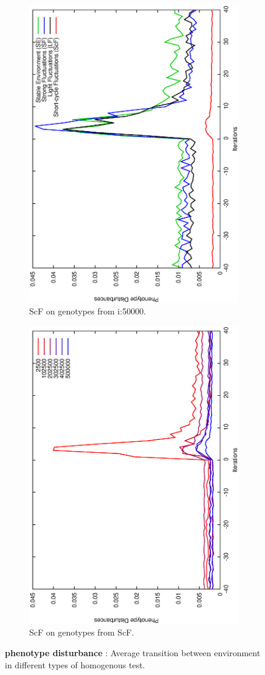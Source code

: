 \begin{figure}[H]
\begin{subfigure}{.25\textwidth}
  \centering
  \includegraphics[width=.7\linewidth, angle =-90]{img/Sucavg499999variationSmallb.eps}
  \caption{ScF on genotypes from i:50000.}
  \label{fig:transstest}
\end{subfigure}%
\begin{subfigure}{.25\textwidth}
  \centering
  \includegraphics[width=.7\linewidth, angle =-90]{img/SucavgvarSmallValidvariationSmallb.eps}
  \caption{ScF on genotypes from ScF.}
  \label{fig:transonly}
\end{subfigure}
\caption{\textbf{phenotype disturbance} : Average transition between environment in different types of homogenous test.}
\label{fig:trans}
\end{figure}


